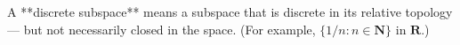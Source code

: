 A **discrete subspace** means a subspace that is discrete in its relative topology — but not necessarily closed in the space. (For example, $\{1/n : n \in \mathbf{N}\}$ in $\mathbf{R}$.)
